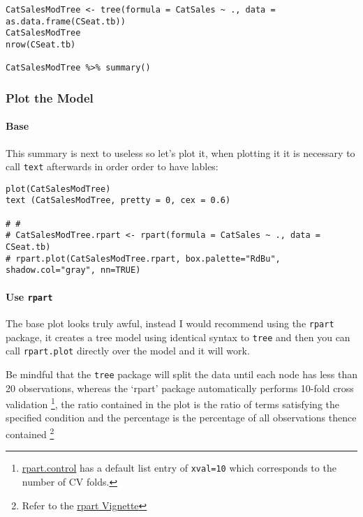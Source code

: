 \documentclass[12pt]{article}
\newcommand{\passthrough}[1]{#1}
\begin{document}
\begin{lstlisting}
CatSalesModTree <- tree(formula = CatSales ~ ., data = as.data.frame(CSeat.tb))
CatSalesModTree
nrow(CSeat.tb)

CatSalesModTree %>% summary()
\end{lstlisting}

\hypertarget{plot-the-model}{%
\subsubsection{Plot the Model}\label{plot-the-model}}

\hypertarget{base}{%
\paragraph{Base}\label{base}}

This summary is next to useless so let's plot it, when plotting it it is
necessary to call \passthrough{\lstinline!text!} afterwards in order
order to have lables:

\begin{lstlisting}
plot(CatSalesModTree)
text (CatSalesModTree, pretty = 0, cex = 0.6)

# #
# CatSalesModTree.rpart <- rpart(formula = CatSales ~ ., data = CSeat.tb)
# rpart.plot(CatSalesModTree.rpart, box.palette="RdBu", shadow.col="gray", nn=TRUE)
\end{lstlisting}

\hypertarget{use-rpart}{%
\paragraph{\texorpdfstring{Use
\texttt{rpart}}{Use rpart}}\label{use-rpart}}

The base plot looks truly awful, instead I would recommend using the
\passthrough{\lstinline!rpart!} package, it creates a tree model using
identical syntax to \passthrough{\lstinline!tree!} and then you can call
\passthrough{\lstinline!rpart.plot!} directly over the model and it will
work.

Be mindful that the \passthrough{\lstinline!tree!} package will split
the data until each node has less than 20 observations, whereas the
`rpart' package automatically performs 10-fold cross validation
\footnote{\href{https://www.rdocumentation.org/packages/rpart/versions/4.1-15/topics/rpart.control}{rpart.control}
  has a default list entry of \passthrough{\lstinline!xval=10!} which
  corresponds to the number of CV folds.}, the ratio contained in the
plot is the ratio of terms satisfying the specified condition and the
percentage is the percentage of all observations thence contained
\footnote{Refer to the
  \href{http://www.milbo.org/rpart-plot/prp.pdf}{rpart Vignette}}
\end{document}
